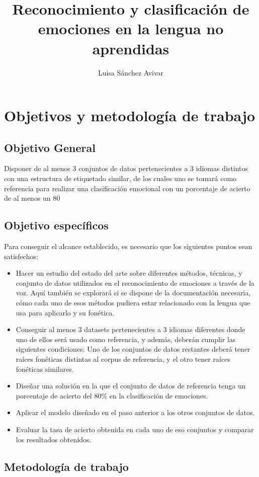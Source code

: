 \documentclass[11pt,a4paper,spanish]{book}
\begin{document}
	\title{Reconocimiento y clasificación de emociones en la lengua no aprendidas}
	\author{Luisa Sánchez Avivar}
	
	
	\chapter{Objetivos y metodología de trabajo}
		
	\section{Objetivo General}
	Disponer de al menos 3 conjuntos de datos pertenecientes a 3 idiomas distintos con una estructura de etiquetado similar, de los cuales uno se tomará como referencia para realizar una clasificación emocional con un porcentaje de acierto de al menos  un 80%
	
	\section{Objetivo específicos}
	Para conseguir el alcance establecido, es necesario que los siguientes puntos sean satisfechos:
	\begin{itemize}
		\item Hacer un estudio del estado del arte sobre diferentes métodos, técnicas, y conjunto de datos utilizados en el reconocimiento de emociones a través de la voz. Aquí también se explorará si se dispone de la documentación necesaria, cómo cada uno de esos métodos pudiera estar relacionado con la lengua que usa para aplicarlo y su fonética.
		
		\item  Conseguir al menos 3 datasets pertenecientes a 3 idiomas diferentes donde uno de ellos será usado como referencia, y además, deberán cumplir las siguientes condiciones: Uno de los conjuntos de datos restantes deberá tener raíces fonéticas distintas al corpus de referencia, y el otro tener raíces fonéticas similares.
		
		\item Diseñar una solución en la que el conjunto de datos de referencia tenga un porcentaje de acierto del 80\% en la clasificación de emociones.
		
		\item Aplicar el modelo diseñado en el paso anterior a los otros conjuntos de datos.
		
		\item Evaluar la tasa de acierto obtenida en cada uno de eso conjuntos y comparar los resultados obtenidos.
		
	\end{itemize}
	\section{Metodología de trabajo}
	
	\begin{comment}
	Metodologia:
		https://assaf-pinhasi.medium.com/towards-a-development-methodology-for-machine-learning-part-i-f1050a0bc607
	\end{comment}
	
	
	\printbibliography
	
\end{document}
